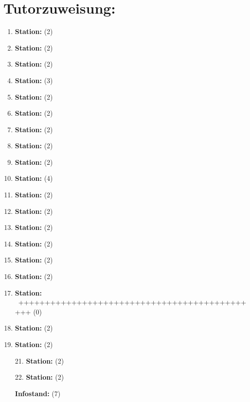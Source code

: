 \documentclass{scrartcl}
\begin{document}
	\section*{Tutorzuweisung:}
	
	\normalsize 
	
	\begin{enumerate}
		\setlength\itemsep{3.5em}
		\item \textbf{Station:} \dotfill (2)
		\item \textbf{Station:} \dotfill (2)  
		\item \textbf{Station:} \dotfill (2)
		\item \textbf{Station:} \dotfill (3)
		\item \textbf{Station:} \dotfill (2)
		\item \textbf{Station:} \dotfill (2)
		\item \textbf{Station:} \dotfill (2)
		\item \textbf{Station:} \dotfill (2)
		\item \textbf{Station:} \dotfill (2)
		\item \textbf{Station:} \dotfill (4)
		\item \textbf{Station:} \dotfill (2)
		\item \textbf{Station:} \dotfill (2)
		\item \textbf{Station:} \dotfill (2)
		\item \textbf{Station:} \dotfill (2)
		\item \textbf{Station:} \dotfill (2)
		\item \textbf{Station:} \dotfill (2)
		\item \textbf{Station:} \ ++++++++++++++++++++++++++++++++++++++++++++++ (0)
		\item \textbf{Station:} \dotfill (2)
		\item \textbf{Station:} \dotfill (2)
		\item[21.] \textbf{Station:} \dotfill (2)
		\item[22.] \textbf{Station:} \dotfill (2)
		\item[] \textbf{Infostand:} \dotfill (7) 
	\end{enumerate}
\end{document}

